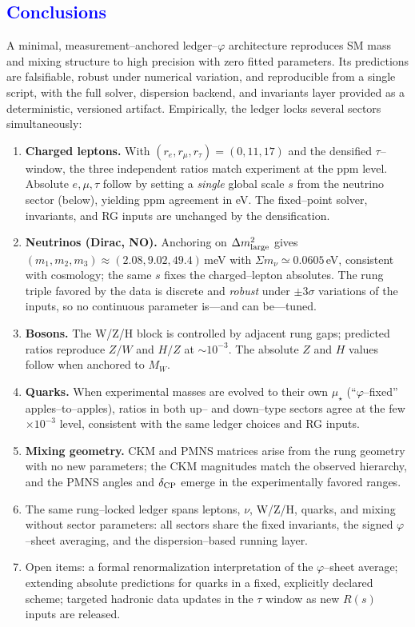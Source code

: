 \documentclass[%
 amsmath,amssymb,
 aps,
prb,
floatfix, showkeys
]{revtex4-2}
\newcommand{\modif}[1]{\textcolor{blue}{#1}}
\begin{document}
\vspace{-1.0cm}

{\modif{
\section{Conclusions}
\label{sec:conclude}
}}

A minimal, measurement–anchored ledger–$\varphi$ architecture reproduces SM mass and mixing structure to high precision with zero fitted parameters. Its predictions are falsifiable, robust under numerical variation, and reproducible from a single script, with the full solver, dispersion backend, and invariants layer provided as a deterministic, versioned artifact.
Empirically, the ledger locks several sectors simultaneously:
\begin{enumerate}
  \item \textbf{Charged leptons.} With $(r_e,r_\mu,r_\tau)=(0,11,17)$ and the densified $\tau$--window, the three independent ratios match experiment at the ppm level. Absolute $e,\mu,\tau$ follow by setting a \emph{single} global scale $s$ from the neutrino sector (below), yielding ppm agreement in eV. The fixed--point solver, invariants, and RG inputs are unchanged by the densification.
  \item \textbf{Neutrinos (Dirac, NO).} Anchoring on $\Delta m^2_{\rm large}$ gives $(m_1,m_2,m_3)\approx(2.08,9.02,49.4)$\,meV with $\Sigma m_\nu\simeq0.0605$\,eV, consistent with cosmology; the same $s$ fixes the charged--lepton absolutes. The rung triple favored by the data is discrete and \emph{robust} under $\pm 3\sigma$ variations of the inputs, so no continuous parameter is—and can be—tuned.
  \item \textbf{Bosons.} The W/Z/H block is controlled by adjacent rung gaps; predicted ratios reproduce $Z/W$ and $H/Z$ at $\sim10^{-3}$. The absolute $Z$ and $H$ values follow when anchored to $M_W$. 
  \item \textbf{Quarks.} When experimental masses are evolved to their own $\mu_\star$ (``$\varphi$--fixed'' apples--to--apples), ratios in both up-- and down--type sectors agree at the few$\times10^{-3}$ level, consistent with the same ledger choices and RG inputs. 
  \item \textbf{Mixing geometry.} CKM and PMNS matrices arise from the rung geometry with no new parameters; the CKM magnitudes match the observed hierarchy, and the PMNS angles and $\delta_{\rm CP}$ emerge in the experimentally favored ranges.
  \item The same rung–locked ledger spans leptons, $\nu$, W/Z/H, quarks, and mixing without sector parameters: all sectors share the fixed invariants, the signed $\varphi$–sheet averaging, and the dispersion–based running layer.
  \item Open items: a formal renormalization interpretation of the $\varphi$–sheet average; extending absolute predictions for quarks in a fixed, explicitly declared scheme; targeted hadronic data updates in the $\tau$ window as new $R(s)$ inputs are released.
\end{enumerate}
\end{document}
